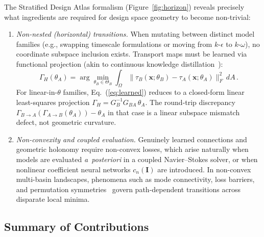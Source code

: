 \documentclass[preprint,aps,prb,longbibliography,superscriptaddress]{revtex4-2}
\newcommand{\bx}{\mathbf{x}}
\newcommand{\bI}{\mathbf{I}}
\begin{document}
The Stratified Design Atlas formalism (Figure~\ref{fig:horizon}) reveals
precisely what ingredients are required for design space geometry to become
non-trivial:
\begin{enumerate}
  \item \textit{Non-nested (horizontal) transitions.} When mutating between
    distinct model families (e.g., swapping timescale formulations or moving
    from $k$-$\epsilon$ to $k$-$\omega$), no coordinate subspace inclusion
    exists. Transport maps must be learned via functional projection (akin to
    continuous knowledge distillation~\cite{Hinton2015}):
    \begin{equation}\label{eq:learned}
      \Gamma_H(\theta_A) = \arg\min_{\theta_B \in \Theta_B}
      \int_\Omega \|\tau_B(\bx;\theta_B) - \tau_A(\bx;\theta_A)\|_F^2\, dA\,.
    \end{equation}
    For linear-in-$\theta$ families, Eq.~(\ref{eq:learned}) reduces to a
    closed-form linear least-squares projection
    $\Gamma_H = G_B^{-1} G_{BA}\, \theta_A$. The round-trip discrepancy
    $\Gamma_{B \to A}(\Gamma_{A \to B}(\theta_A)) - \theta_A$ in that case is
    a linear subspace mismatch defect, not geometric curvature.
  \item \textit{Non-convexity and coupled evaluation.} Genuinely learned
    connections and geometric holonomy require non-convex losses, which arise
    naturally when models are evaluated \emph{a~posteriori} in a coupled
    Navier--Stokes solver, or when nonlinear coefficient neural networks
    $c_n(\bI)$ are introduced. In non-convex multi-basin landscapes, phenomena
    such as mode connectivity, loss barriers, and permutation symmetries~\cite{Draxler2018,Garipov2018,Frankle2018,Ainsworth2022}
    govern path-dependent transitions across disparate local minima.
\end{enumerate}

\subsection{Summary of Contributions}\label{sec:contributions}
\end{document}
